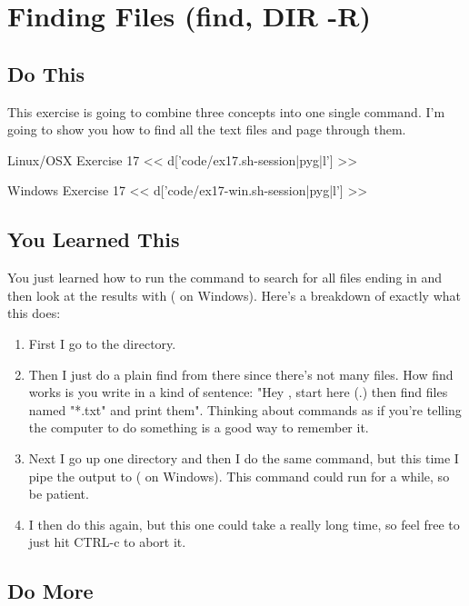 \chapter{Finding Files (find, DIR -R)}

\section{Do This}

This exercise is going to combine three concepts into one single command.  I'm
going to show you how to find all the text files and page through them.

\begin{code}{Linux/OSX Exercise 17}
<< d['code/ex17.sh-session|pyg|l'] >>
\end{code}

\begin{code}{Windows Exercise 17}
<< d['code/ex17-win.sh-session|pyg|l'] >>
\end{code}

\section{You Learned This}

You just learned how to run the  command to search for all files
ending in  and then look at the results with  ( on Windows).  Here's a breakdown of exactly what this does:

\begin{enumerate}
\item First I go to the  directory.
\item Then I just do a plain find from there since there's not many 
files.  How find works is you write in a kind of sentence: "Hey ,
    start here (.) then find files named "*.txt" and print them".  Thinking
    about commands as if you're telling the computer to do something is a good
    way to remember it.
\item Next I go up one directory and then I do the same command, but this time I pipe the output to  ( on Windows).  This command could run for a while, so be patient.
\item I then do this again, but this one could take a really long time, so feel free to just hit CTRL-c to abort it.
\end{enumerate}


\section{Do More}

